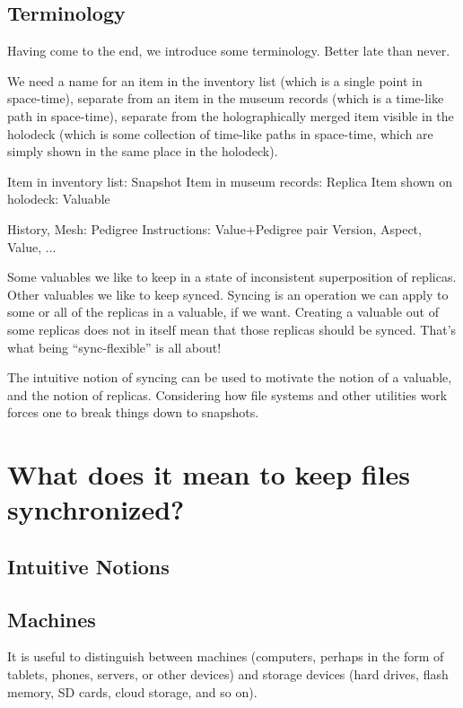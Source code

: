 \documentclass{book}
\begin{document}
\section{Terminology}

Having come to the end, we introduce some terminology.  Better late than never.

We need a name for an item in the inventory list (which is a single point in space-time), separate from an item in the museum records (which is a time-like path in space-time), separate from the holographically merged item visible in the holodeck (which is some collection of time-like paths in space-time, which are simply shown in the same place in the holodeck).

Item in inventory list:  Snapshot
Item in museum records:  Replica
Item shown on holodeck:  Valuable

History, Mesh: Pedigree
Instructions: Value+Pedigree pair
Version, Aspect, Value, ...

Some valuables we like to keep in a state of inconsistent superposition of replicas.  Other valuables we like to keep synced.  Syncing is an operation we can apply to some or all of the replicas in a valuable, if we want.  Creating a valuable out of some replicas does not in itself mean that those replicas should be synced.  That's what being ``sync-flexible'' is all about!

The intuitive notion of syncing can be used to motivate the notion of a valuable, and the notion of replicas.  Considering how file systems and other utilities work forces one to break things down to snapshots.





\chapter{What does it mean to keep files synchronized?}\label{chap:sync}


\section*{Intuitive Notions}

\section{Machines}

It is useful to distinguish between machines (computers, perhaps in the form of tablets, phones, servers, or other devices) and storage devices (hard drives, flash memory, SD cards, cloud storage, and so on).
\end{document}
